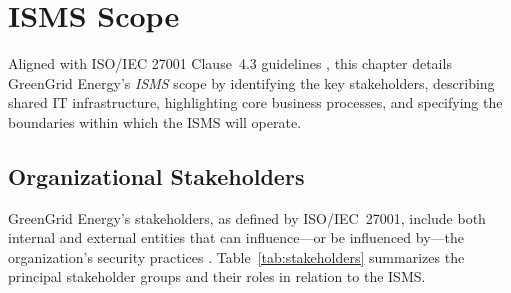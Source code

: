 \chapter{ISMS Scope}
\label{chap:isms_scope}
Aligned with ISO/IEC 27001 Clause~4.3 guidelines \cite{iso27001}, this chapter
details GreenGrid Energy’s \emph{\ac{ISMS}} scope by identifying the key stakeholders,
describing shared \ac{IT} infrastructure, highlighting core business processes,
and specifying the boundaries within which the \ac{ISMS} will operate.

\section{Organizational Stakeholders}
\label{sec:stakeholders}

GreenGrid Energy’s stakeholders, as defined by ISO/IEC~27001, include both internal
and external entities that can influence—or be influenced by—the organization’s security
practices \cite{hightable}. Table~\ref{tab:stakeholders} summarizes the principal stakeholder
groups and their roles in relation to the \ac{ISMS}.

